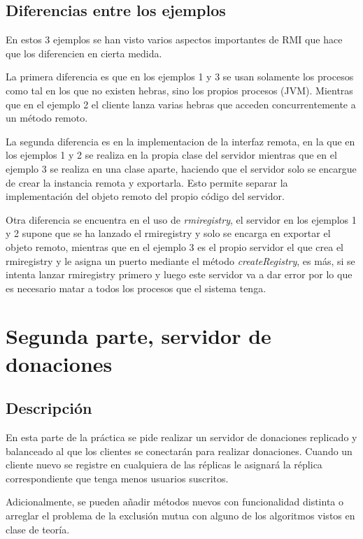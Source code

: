 \documentclass{article}
\begin{document}
\subsection{Diferencias entre los ejemplos}
En estos 3 ejemplos se han visto varios aspectos importantes de RMI que hace que los diferencien en cierta medida. 

La primera diferencia es que en los ejemplos 1 y 3 se usan solamente los procesos como tal en los que no existen hebras, sino los propios procesos (JVM). Mientras que en el ejemplo 2 el cliente lanza varias hebras que acceden concurrentemente a un método remoto.

La segunda diferencia es en la implementacion de la interfaz remota, en la que en los ejemplos 1 y 2 se realiza en la propia clase del servidor mientras que en el ejemplo 3 se realiza en una clase aparte, haciendo que el servidor solo se encargue de crear la instancia remota y exportarla. Esto permite separar la implementación del objeto remoto del propio código del servidor.

Otra diferencia se encuentra en el uso de \textit{rmiregistry}, el servidor en los ejemplos 1 y 2 supone que se ha lanzado el rmiregistry y solo se encarga en exportar el objeto remoto, mientras que en el ejemplo 3 es el propio servidor el que crea el rmiregistry y le asigna un puerto mediante el método \textit{createRegistry}, es más, si se intenta lanzar rmiregistry primero y luego este servidor va a dar error por lo que es necesario matar a todos los procesos que el sistema tenga.


\section{Segunda parte, servidor de donaciones}
\subsection{Descripción}
En esta parte de la práctica se pide realizar un servidor de donaciones replicado y balanceado al que los clientes se conectarán para realizar donaciones. Cuando un cliente nuevo se registre en cualquiera de las réplicas le asignará la réplica correspondiente que tenga menos usuarios suscritos.

Adicionalmente, se pueden añadir métodos nuevos con funcionalidad distinta o arreglar el problema de la exclusión mutua con alguno de los algoritmos vistos en clase de teoría.
\end{document}
